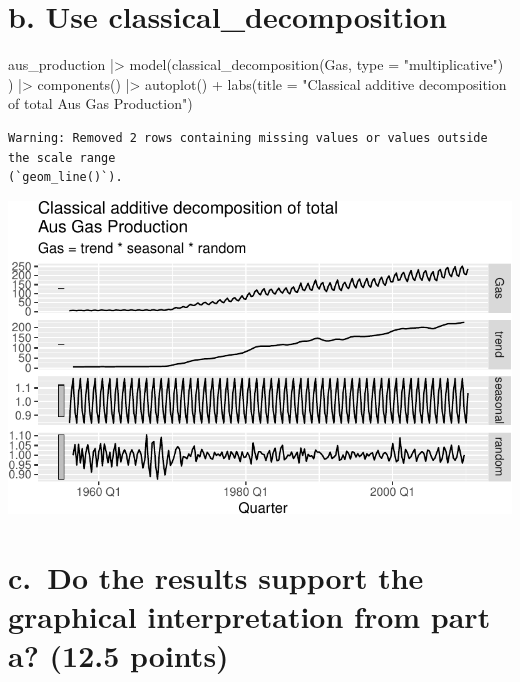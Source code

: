 \documentclass[
  letterpaper,
  DIV=11,
  numbers=noendperiod]{scrartcl}
\newenvironment{Shaded}{\begin{snugshade}}{\end{snugshade}}
\newcommand{\AttributeTok}[1]{\textcolor[rgb]{0.40,0.45,0.13}{#1}}
\newcommand{\FunctionTok}[1]{\textcolor[rgb]{0.28,0.35,0.67}{#1}}
\newcommand{\NormalTok}[1]{\textcolor[rgb]{0.00,0.23,0.31}{#1}}
\newcommand{\SpecialCharTok}[1]{\textcolor[rgb]{0.37,0.37,0.37}{#1}}
\newcommand{\StringTok}[1]{\textcolor[rgb]{0.13,0.47,0.30}{#1}}
\begin{document}
\section{b. Use
classical\_decomposition}\label{b.-use-classical_decomposition}

\begin{Shaded}
\begin{Highlighting}[]
\NormalTok{aus\_production }\SpecialCharTok{|\textgreater{}}
\FunctionTok{model}\NormalTok{(}\FunctionTok{classical\_decomposition}\NormalTok{(Gas, }\AttributeTok{type =} \StringTok{"multiplicative"}\NormalTok{)}
\NormalTok{) }\SpecialCharTok{|\textgreater{}}
\FunctionTok{components}\NormalTok{() }\SpecialCharTok{|\textgreater{}}
\FunctionTok{autoplot}\NormalTok{() }\SpecialCharTok{+}
\FunctionTok{labs}\NormalTok{(}\AttributeTok{title =} \StringTok{"Classical additive decomposition of total}
\StringTok{Aus Gas Production"}\NormalTok{)}
\end{Highlighting}
\end{Shaded}

\begin{verbatim}
Warning: Removed 2 rows containing missing values or values outside the scale range
(`geom_line()`).
\end{verbatim}

\includegraphics{HW2_IBM6520_files/figure-pdf/unnamed-chunk-7-1.pdf}

\section{c.~Do the results support the graphical interpretation from
part a? (12.5
points)}\label{c.-do-the-results-support-the-graphical-interpretation-from-part-a-12.5-points}
\end{document}
